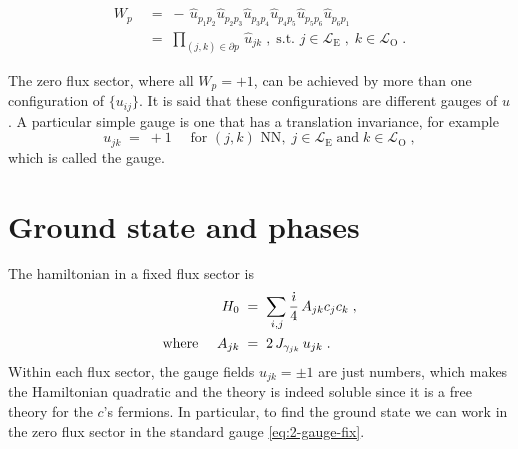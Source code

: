 \begin{figure}[h!]
  \begin{minipage}{.2\textwidth}
    \centering
    \scalebox{1.3}{ }
  \end{minipage}%
  \begin{minipage}{.8\textwidth}
\begin{equation}
        \begin{split}
       W_{p} \; &= \; - \,  \hat{u}_{p_1p_2}\hat{u}_{p_2p_3}\hat{u}_{p_3p_4}\hat{u}_{p_4p_5}\hat{u}_{p_5p_6}\hat{u}_{p_6p_1} \\[8pt]  \; &= \; \prod_{(j,k)\in \partial p} \, \hat{u}_{jk} \; , \;  \text{s.t. } j \in \mathcal{L}_{\text{E}}  \; ,\; k \in \mathcal{L}_{\text{O}} \; .
   \end{split}
\end{equation}
  \end{minipage}
  \end{figure}
  
  
The zero flux sector, where all $W_p = +1$, can be achieved by more than one configuration of $\{u_{ij}\}$. It is said that these configurations are different gauges of $u$. A particular simple gauge is one that has a translation invariance, for example 
\begin{equation}
    u_{jk} \; = \; +1 \quad  \text{ for } (j,k) \text{ NN}, \;  j \in \mathcal{L}_{\text{E}} \; \text{and} \;  k \in \mathcal{L}_{\text{O}} \; , \label{eq:2-gauge-fix}
\end{equation}
which is called the  gauge.

\section{Ground state and phases}
The hamiltonian in a fixed flux sector is
\begin{equation}
    \begin{split}
        H_{0} \; &= \; \sum_{\,i,j } \frac{\dot{\imath} }{ 4} \, A_{jk} c_j c_k  \; , \\
        \text{where } \quad A_{jk} \;  &= \; 2 \, J_{\gamma_{jk}} \, u_{jk} \; .
    \end{split}
\end{equation}
Within  each flux sector, the gauge fields  $ u_{jk} = \pm 1$ are just numbers, which makes the Hamiltonian quadratic and the theory is indeed soluble since it is a free theory for the $c$'s fermions. In particular, to find the ground state we can work in the zero flux sector in the standard gauge \eqref{eq:2-gauge-fix}.

